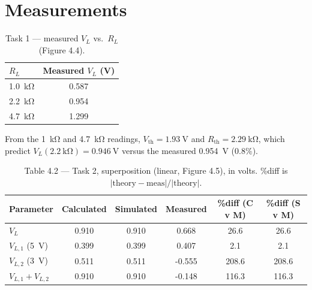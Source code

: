 \documentclass[11pt]{article}
\begin{document}
\section*{Measurements}

\begin{table}[H]
    \centering
    \caption{Task 1 --- measured $V_L$ vs.\ $R_L$ (Figure 4.4).}
    \begin{tabular}{l S[table-format=1.3]}
        \toprule
        $R_L$ & {Measured $V_L$ (\si{\volt})} \\
        \midrule
        \SI{1.0}{\kilo\ohm} & 0.587 \\
        \SI{2.2}{\kilo\ohm} & 0.954 \\
        \SI{4.7}{\kilo\ohm} & 1.299 \\
        \bottomrule
    \end{tabular}
\end{table}
\noindent From the \SI{1}{\kilo\ohm} and \SI{4.7}{\kilo\ohm} readings,
$V_{\text{th}}=\SI{1.93}{\volt}$ and $R_{\text{th}}=\SI{2.29}{\kilo\ohm}$, which
predict $V_L(\SI{2.2}{\kilo\ohm})=\SI{0.946}{\volt}$ versus the measured
\SI{0.954}{\volt} ($0.8\%$).

\begin{table}[H]
    \centering
    \caption{Table 4.2 --- Task 2, superposition (linear, Figure 4.5), in volts. \%diff is $|\text{theory}-\text{meas}|/|\text{theory}|$.}
    \label{tab:t42}
    \begin{tabular}{l S[table-format=1.3] S[table-format=1.3] S[table-format=-1.3] S[table-format=3.1] S[table-format=3.1]}
        \toprule
        Parameter & {Calculated} & {Simulated} & {Measured} & {\%diff (C v M)} & {\%diff (S v M)} \\
        \midrule
        $V_L$                      & 0.910 & 0.910 & 0.668  & 26.6  & 26.6 \\
        $V_{L,1}$ (\SI{5}{\volt})  & 0.399 & 0.399 & 0.407  & 2.1   & 2.1  \\
        $V_{L,2}$ (\SI{3}{\volt})  & 0.511 & 0.511 & -0.555 & 208.6 & 208.6 \\
        $V_{L,1}+V_{L,2}$          & 0.910 & 0.910 & -0.148 & 116.3 & 116.3 \\
        \bottomrule
    \end{tabular}
\end{table}
\end{document}
